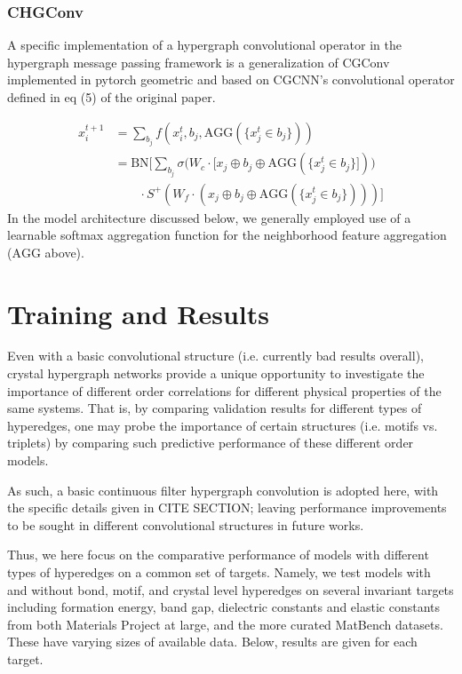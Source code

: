 \documentclass[10pt,a4paper]{article}
\begin{document}
\subsubsection{CHGConv}
A specific implementation of a hypergraph convolutional operator in the hypergraph message passing framework is a generalization of CGConv implemented in pytorch geometric and based on CGCNN's convolutional operator defined in eq (5) of the original paper.

\begin{align*}
x_i^{t+1} &= \sum_{b_j} f(x_i^t, b_j,\text{AGG}(\lbrace x_j^t\in b_j \rbrace )) \\ 
& = \text{BN}\bigg[\sum_{b_j}\sigma \big(W_c\cdot [x_j\oplus b_j\oplus \text{AGG}(\lbrace x_j^t\in b_j \rbrace ] )\big)\\
&\quad\quad\cdot S^+ (W_f\cdot (x_j\oplus b_j\oplus \text{AGG}(\lbrace x_j^t\in b_j \rbrace ) )  ) \bigg]
\end{align*}
In the model architecture discussed below, we generally employed use of a learnable softmax aggregation function for the neighborhood feature aggregation ($\text{AGG}$ above).


\section{Training and Results}
Even with a basic convolutional structure (i.e. currently bad results overall), crystal hypergraph networks provide a unique opportunity to investigate the importance of different order correlations for different physical properties of the same systems. That is, by comparing validation results for different types of hyperedges, one may probe the importance of certain structures (i.e. motifs vs. triplets) by comparing such predictive performance of these different order models.

As such, a basic continuous filter hypergraph convolution is adopted here, with the specific details given in CITE SECTION; leaving performance improvements to be sought in different convolutional structures in future works. 

Thus, we here focus on the comparative performance of models with different types of hyperedges on a common set of targets. Namely, we test models with and without bond, motif, and crystal level hyperedges on several invariant targets including formation energy, band gap, dielectric constants and elastic constants from both Materials Project at large, and the more curated MatBench datasets. These have varying sizes of available data. Below, results are given for each target.
\end{document}
